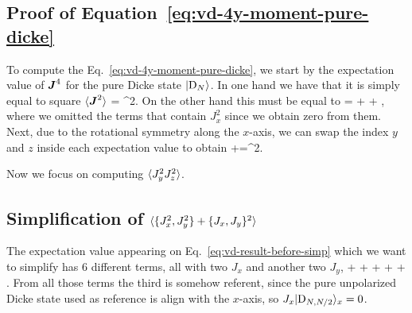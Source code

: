 \subsection {Proof of Equation~\eqref{eq:vd-4y-moment-pure-dicke}}
\label{app:proof-of-4th-y-moment-pure-dicke}

To compute the Eq.~\eqref{eq:vd-4y-moment-pure-dicke}, we start by the expectation value of $\boldsymbol{J}^4$ for the pure Dicke state $\vert{\ensuremath{\textnormal{D}_{N}}}\rangle$.
In one hand we have that it is simply equal to square $\langle{\ensuremath{\boldsymbol{J}}^2}\rangle$
\be
   = \lpar{}\rpar^2.
\ee
On the other hand this must be equal to
\be
   =  +  + ,
\ee
where we omitted the terms that contain $J_x^2$ since we obtain zero from them.
Next, due to the rotational symmetry along the $x$-axis, we can swap the index $y$ and $z$ inside each expectation value to obtain
\be
  +=\lpar{}\rpar^2.
\ee

Now we focus on computing $\langle{J_y^2J_z^2}\rangle$.


\subsection[Simplification of the Equation~\eqref{eq:vd-result-before-simp}]
{Simplification of $\langle{\{J_x^2,J_y^2\}+\{J_x,J_y\}^2}\rangle$}
\label{app:simplification-of-4th-moments}

The expectation value appearing on Eq.~\eqref{eq:vd-result-before-simp} which we want to simplify has 6 different terms, all with two $J_x$ and another two $J_y$,
\be
   +  + 
  +  +  + .
\ee
From all those terms the third is somehow referent, since the pure unpolarized Dicke state used as reference is align with the $x$-axis, so $J_x\vert{\ensuremath{\textnormal{D}_{N,N/2}}}\rangle_x=0$.

